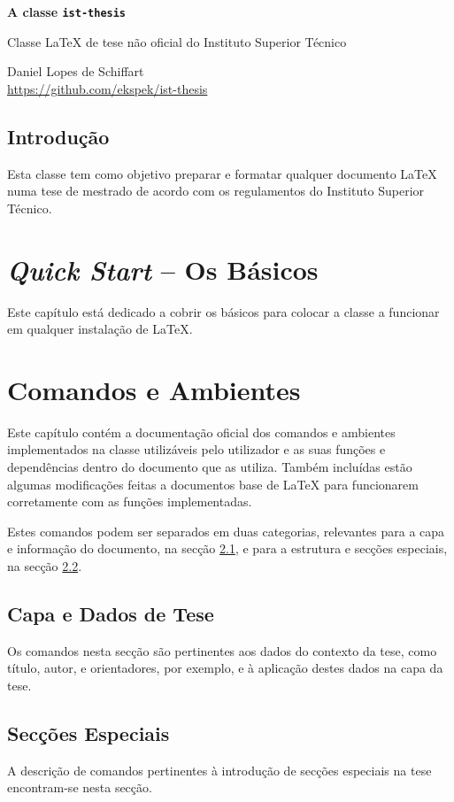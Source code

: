 \documentclass{../ist-thesis}
\begin{document}
\begin{center}
	{\Huge\bfseries A classe \texttt{ist-thesis}}
	\par\bigskip
	{\Large Classe LaTeX de tese não oficial do Instituto Superior Técnico}
	\par\bigskip\smallskip
	Daniel Lopes de Schiffart \\
	\url{https://github.com/ekspek/ist-thesis}
\end{center}

\bigskip\bigskip

\begin{center}
	\section*{Introdução}
\end{center}
Esta classe tem como objetivo preparar e formatar qualquer documento \LaTeX{} numa tese de mestrado de acordo com os regulamentos do Instituto Superior Técnico.

\tableofcontents

\clearpage

\chapter{\textit{Quick Start} -- Os Básicos}

Este capítulo está dedicado a cobrir os básicos para colocar a classe a funcionar em qualquer instalação de \LaTeX{}.

\chapter{Comandos e Ambientes}

Este capítulo contém a documentação oficial dos comandos e ambientes implementados na classe utilizáveis pelo utilizador e as suas funções e dependências dentro do documento que as utiliza. Também incluídas estão algumas modificações feitas a documentos base de \LaTeX{} para funcionarem corretamente com as funções implementadas.

Estes comandos podem ser separados em duas categorias, relevantes para a capa e informação do documento, na secção \ref{sec:metadata}, e para a estrutura e secções especiais, na secção \ref{sec:spec}.

\section{Capa e Dados de Tese}\label{sec:metadata}

Os comandos nesta secção são pertinentes aos dados do contexto da tese, como título, autor, e orientadores, por exemplo, e à aplicação destes dados na capa da tese.

\section{Secções Especiais}\label{sec:spec}

A descrição de comandos pertinentes à introdução de secções especiais na tese encontram-se nesta secção.
\end{document}

